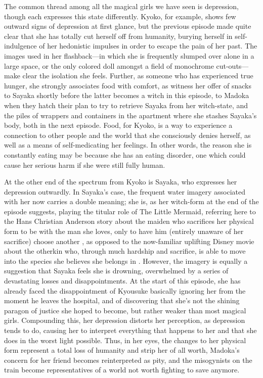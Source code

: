 The common thread among all the magical girls we have seen is depression, though each expresses this state differently. Kyoko, for example, shows few outward signs of depression at first glance, but the previous episode made quite clear that she has totally cut herself off from humanity, burying herself in self-indulgence of her hedonistic impulses in order to escape the pain of her past. The images used in her flashback—in which she is frequently slumped over alone in a large space, or the only colored doll amongst a field of monochrome cut-outs—make clear the isolation she feels. Further, as someone who has experienced true hunger, she strongly associates food with comfort, as witness her offer of snacks to Sayaka shortly before the latter becomes a witch in this episode, to Madoka when they hatch their plan to try to retrieve Sayaka from her witch-state, and the piles of wrappers and containers in the apartment where she stashes Sayaka's body, both in the next episode. Food, for Kyoko, is a way to experience a connection to other people and the world that she consciously denies herself, as well as a means of self-medicating her feelings. In other words, the reason she is constantly eating may be because she has an eating disorder, one which could cause her serious harm if she were still fully human.

At the other end of the spectrum from Kyoko is Sayaka, who expresses her depression outwardly. In Sayaka's case, the frequent water imagery associated with her now carries a double meaning; she is, as her witch-form at the end of the episode suggests, playing the titular role of The Little Mermaid, referring here to the Hans Christian Anderson story about the maiden who sacrifices her physical form to be with the man she loves, only to have him (entirely unaware of her sacrifice) choose another \cite{ref56}, as opposed to the now-familiar uplifting Disney movie about the otherkin who, through much hardship and sacrifice, is able to move into the species she believes she belongs in \cite{ref57}. However, the imagery is equally a suggestion that Sayaka feels she is drowning, overwhelmed by a series of devastating losses and disappointments. At the start of this episode, she has already faced the disappointment of Kyousuke basically ignoring her from the moment he leaves the hospital, and of discovering that she's not the shining paragon of justice she hoped to become, but rather weaker than most magical girls. Compounding this, her depression distorts her perception, as depression tends to do, causing her to interpret everything that happens to her and that she does in the worst light possible. Thus, in her eyes, the changes to her physical form represent a total loss of humanity and strip her of all worth, Madoka's concern for her friend becomes reinterpreted as pity, and the misogynists on the train become representatives of a world not worth fighting to save anymore.

